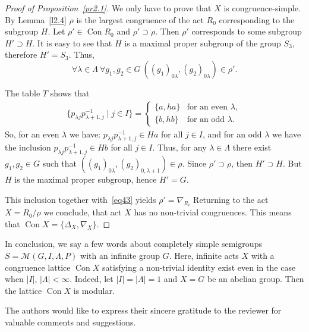 \documentclass{birkau}
\numberwithin{equation}{section}
\theoremstyle{plain}
\theoremstyle{definition}
\DeclareMathOperator{\Con}{Con}
\begin{document}
\begin{proof}[Proof of Proposition~\ref{pr2.1}]
		We only have to prove that $X$ is congruence-simple. By Lemma~\ref{l2.4} $\rho$ is the largest congruence of the act $R_0$ corresponding to the subgroup $H$. Let $\rho' \in \Con R_0$ and $\rho' \supset \rho$. Then $\rho'$ corresponds to some subgroup $H' \supset H$. It is easy to see that $H$ is a maximal proper subgroup of the group $S_3$, therefore $H' = S_3$. Thus,
		\begin{equation}
		    \forall \lambda \in \Lambda \ \forall g_1,g_2 \in G \ ((g_1)_{0 \lambda},(g_2)_{0 \lambda}) \in \rho'. \label{eq43}
		\end{equation}
		
		The table $T$ shows that
		\begin{gather*}
		\{ p_{\lambda j} p_{\lambda+1,j}^{-1} \mid j \in I \} =
			\begin{cases}
				\{a, ha\} & \text{for an even $\lambda$},\\
				\{b, hb\} & \text{for an odd $\lambda$}.
			\end{cases}
		\end{gather*}
		So, for an even $\lambda$ we have: $p_{\lambda j} p_{\lambda+1,j}^{-1} \in Ha$ for all $j \in I$, and for an odd $\lambda$ we have the inclusion $p_{\lambda j} p_{\lambda+1,j}^{-1} \in Hb$ for all $j \in I$. Thus, for any $\lambda \in \Lambda$ there exist $g_1,g_2 \in G$ such that $((g_1)_{0 \lambda},(g_2)_{0,\lambda+1}) \in \rho$.
		Since $\rho' \supset \rho$, then $H' \supset H$. But $H$ is the maximal proper subgroup, hence $H' = G$.
		
		This inclusion together with~\eqref{eq43} yields $\rho' = \nabla_{R_i}$ Returning to the act $X = {R_0}/{\rho}$ we conclude, that act $X$ has no non-trivial congruences. This means that $\Con X = \{ \Delta_X,\nabla_X \}$.
	\end{proof}
	
	In conclusion, we say a few words about completely simple semigroups $S = \mathcal{M}(G,I,\Lambda,P)$ with an infinite group $G$. Here, infinite acts $X$ with a congruence lattice $\Con X$ satisfying a non-trivial identity exist even in the case when $|I|$, $|\Lambda| < \infty$. Indeed, let $|I| = |\Lambda| = 1$ and $X=G$ be an abelian group. Then the lattice $\Con X$ is modular.
	
	The authors would like to express their sincere gratitude to the reviewer for valuable comments and suggestions.
	
	
	
\end{document}
